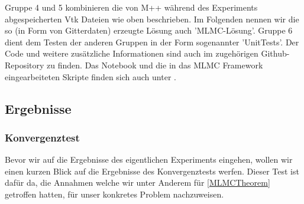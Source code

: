 Gruppe 4 und 5 kombinieren die von M++ während des Experiments abgespeicherten Vtk Dateien wie oben beschrieben. Im Folgenden nennen wir die so (in Form von Gitterdaten) erzeugte Lösung auch 'MLMC-Lösung'.
Gruppe 6 dient dem Testen der anderen Gruppen in der Form sogenannter 'UnitTests'.
Der Code und weitere zusätzliche Informationen sind auch im zugehörigen Github-Repository \cite{githubvtk} zu finden. Das Notebook und die in das MLMC Framework eingearbeiteten Skripte finden sich auch unter \cite{branchMLMCTP}.

\subsection{Ergebnisse}
\subsubsection{Konvergenztest}
Bevor wir auf die Ergebnisse des eigentlichen Experiments eingehen, wollen wir einen kurzen Blick auf die Ergebnisse des Konvergenztests werfen. Dieser Test ist dafür da, die Annahmen welche wir unter Anderem für \eqref{MLMCTheorem} getroffen hatten, für unser konkretes Problem nachzuweisen.




